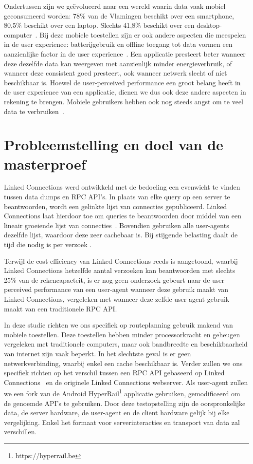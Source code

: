 Ondertussen zijn we geëvolueerd naar een wereld waarin data vaak mobiel geconsumeerd worden: 78\% van de Vlamingen beschikt over een smartphone, 80,5\% beschikt over een laptop. Slechts 41,8\% beschikt over een desktop-computer~\citep{digimeter17}. Bij deze mobiele toestellen zijn er ook andere aspecten die meespelen in de user experience: batterijgebruik en offline toegang tot data vormen een aanzienlijke factor in de user experience~\citep{ickin12}. Een applicatie presteert beter wanneer deze dezelfde data kan weergeven met aanzienlijk minder energieverbruik, of wanneer deze consistent goed presteert, ook wanneer netwerk slecht of niet beschikbaar is. Hoewel de user-perceived performance een groot belang heeft in de user experience van een applicatie, dienen we dus ook deze andere aspecten in rekening te brengen. Mobiele gebruikers hebben ook nog steeds angst om te veel data te verbruiken~\citep{ammelrooy17}.


\section{Probleemstelling en doel van de masterproef}
\label{sec:problem}

Linked Connections werd ontwikkeld met de bedoeling een evenwicht te vinden tussen data dumps en RPC API's. In plaats van elke query op een server te beantwoorden, wordt een gelinkte lijst van connecties gepubliceerd. Linked Connections laat hierdoor toe om queries te beantwoorden door middel van een lineair groeiende lijst van connecties~\citep{colpaert15}. Bovendien gebruiken alle user-agents dezelfde lijst, waardoor deze zeer cachebaar is. Bij stijgende belasting daalt de tijd die nodig is per verzoek \citep{colpaert17}.

Terwijl de cost-efficiency van Linked Connections reeds is aangetoond, waarbij Linked Connections hetzelfde aantal verzoeken kan beantwoorden met slechts 25\% van de rekencapacteit\citep{colpaert17,Melendez17}, is er nog geen onderzoek gebeurt naar de user-perceived performance van een user-agent wanneer deze gebruik maakt van Linked Connections, vergeleken met wanneer deze zelfde user-agent gebruik maakt van een traditionele RPC API. 

In deze studie richten we ons specifiek op routeplanning gebruik makend van mobiele toestellen. Deze toestellen hebben minder processorkracht en geheugen vergeleken met traditionele computers, maar ook bandbreedte en beschikbaarheid van internet zijn vaak beperkt. In het slechtste geval is er geen netwerkverbinding, waarbij enkel een cache beschikbaar is. Verder zullen we ons specifiek richten op het verschil tussen een RPC API gebaseerd op Linked Connections~\citep{colpaert17} en de originele Linked Connections webserver. Als user-agent zullen we een fork van de Android HyperRail\footnote{https://hyperrail.be} applicatie gebruiken, gemodificeerd om de genoemde API's te gebruiken. Door deze testopstelling zijn de oorspronkelijke data, de server hardware, de user-agent en de client hardware gelijk bij elke vergelijking. Enkel het formaat voor serverinteracties en transport van data zal verschillen.

